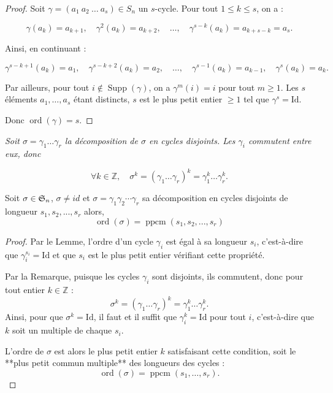 \begin{proof}
    Soit $\gamma = (a_1\ a_2\ \dots\ a_s) \in S_n$ un $s$-cycle. Pour tout $1 \leq k \leq s$, on a :

\[
\gamma(a_k) = a_{k+1}, \quad \gamma^2(a_k) = a_{k+2}, \quad \dots, \quad \gamma^{s-k}(a_k) = a_{k+s-k} = a_s.
\]

Ainsi, en continuant :

\[
\gamma^{s-k+1}(a_k) = a_1, \quad \gamma^{s-k+2}(a_k) = a_2, \quad \dots, \quad \gamma^{s-1}(a_k) = a_{k-1}, \quad \gamma^s(a_k) = a_k.
\]

Par ailleurs, pour tout $i \notin \operatorname{Supp}(\gamma)$, on a $\gamma^m(i) = i$ pour tout $m \geq 1$. Les $s$ éléments $a_1, \dots, a_s$ étant distincts, $s$ est le plus petit entier $\geq 1$ tel que $\gamma^s = \text{Id}$.

\medskip

Donc $\operatorname{ord}(\gamma) = s$.
\end{proof}

\begin{remarque}
     \textit{Soit $\sigma = \gamma_1 \dots \gamma_r$ la décomposition de $\sigma$ en cycles disjoints. Les $\gamma_i$ commutent entre eux, donc}  

\[
\forall k \in \mathbb{Z}, \quad \sigma^k = (\gamma_1 \dots \gamma_r)^k = \gamma_1^k \dots \gamma_r^k.
\]
\end{remarque}

 \begin{proposition}
        Soit $\sigma\in \mathfrak{S}_n$, $\sigma \neq id$ et $\sigma= \gamma_1\gamma_2\cdots\gamma_r$ sa décomposition en cycles disjoints de longueur $s_1,s_2,...,s_r$ alors,
        \[
        \operatorname{ord}(\sigma)=\operatorname{ppcm}(s_1,s_2,...,s_r)
        \]
\end{proposition}

\begin{proof}
    Par le Lemme, l'ordre d'un cycle $\gamma_i$ est égal à sa longueur $s_i$, c'est-à-dire que $\gamma_i^{s_i} = \text{Id}$ et que $s_i$ est le plus petit entier vérifiant cette propriété.  

Par la Remarque, puisque les cycles $\gamma_i$ sont disjoints, ils commutent, donc pour tout entier $k \in \mathbb{Z}$ :
\[
\sigma^k = (\gamma_1 \dots \gamma_r)^k = \gamma_1^k \dots \gamma_r^k.
\]
Ainsi, pour que $\sigma^k = \text{Id}$, il faut et il suffit que $\gamma_i^k = \text{Id}$ pour tout $i$, c'est-à-dire que $k$ soit un multiple de chaque $s_i$.  

L'ordre de $\sigma$ est alors le plus petit entier $k$ satisfaisant cette condition, soit le **plus petit commun multiple** des longueurs des cycles :
\[
\operatorname{ord}(\sigma) = \operatorname{ppcm}(s_1, \dots, s_r).
\]
\end{proof}

